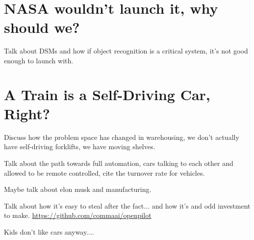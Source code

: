 \section{NASA wouldn't launch it, why should we?}

Talk about DSMs and how if object recognition is a critical system, it's not good enough to launch with.

\section{A Train is a Self-Driving Car, Right?}

Discuss how the problem space has changed in warehousing, we don't actually have self-driving forklifts, we have moving shelves.

Talk about the path towards full automation, cars talking to each other and allowed to be remote controlled, cite the turnover rate for vehicles.

Maybe talk about elon musk and manufacturing.

Talk about how it's easy to steal after the fact... and how it's and odd investment to make. \url{https://github.com/commaai/openpilot}

Kids don't like cars anyway.... 
